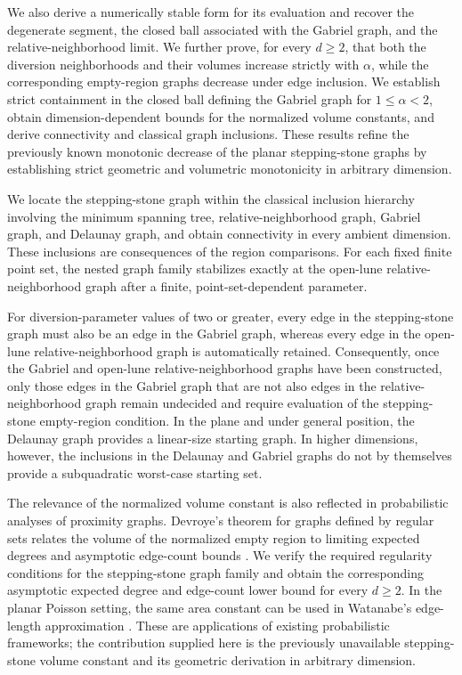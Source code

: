 \documentclass[a4paper,fleqn]{cas-dc}
\theoremstyle{definition}
\theoremstyle{remark}
\newcommand{\0}{\mathbf{0}}
\begin{document}
We also derive a numerically stable form for its evaluation and recover the
degenerate segment, the closed ball associated with the Gabriel graph, 
and the relative-neighborhood limit.
We further prove, for every $d\geq2$, that both the diversion neighborhoods
and their volumes increase strictly with $\alpha$, while the corresponding
empty-region graphs decrease under edge inclusion. We establish strict
containment in
the closed ball defining the Gabriel graph
for $1\leq\alpha<2$, obtain dimension-dependent bounds for the normalized
volume constants, and derive connectivity and classical graph inclusions.
These results refine the previously known monotonic decrease of the planar
stepping-stone graphs by establishing strict geometric and volumetric
monotonicity in arbitrary dimension.


We
locate the stepping-stone graph within 
the classical inclusion hierarchy involving the
minimum spanning tree, relative-neighborhood graph, Gabriel graph, and
Delaunay graph, and obtain connectivity in every ambient dimension. 
These inclusions are consequences of the region comparisons. 
For each fixed finite
point set, the nested graph family stabilizes exactly at the open-lune
relative-neighborhood graph after a finite, point-set-dependent parameter.



For diversion-parameter values of two or greater, 
every edge in the stepping-stone graph
must also be an edge in the Gabriel graph, 
whereas every edge in the open-lune relative-neighborhood graph
is automatically retained. Consequently, once the Gabriel and open-lune
relative-neighborhood graphs have been constructed, 
only those edges in the Gabriel graph that are not also edges 
in the relative-neighborhood graph remain undecided and require
evaluation of the stepping-stone empty-region condition. In the plane and
under general position, the Delaunay graph provides a linear-size starting
graph. In higher dimensions, however, 
the inclusions in the Delaunay and Gabriel graphs
do not by themselves provide a subquadratic worst-case starting set.

The relevance of the normalized volume constant is also reflected in
probabilistic analyses of proximity graphs.
Devroye's theorem for graphs defined by regular sets
relates the volume of the normalized empty
region to limiting expected degrees and asymptotic edge-count bounds
\citep{devroye1988expected}. We verify the required regularity conditions for
the stepping-stone graph family and obtain the corresponding asymptotic expected
degree and edge-count lower bound for every $d\geq2$.
In the planar Poisson setting, the same area constant can be used in
Watanabe's edge-length approximation
\citep{watanabe2008evaluating}.
These are applications of existing probabilistic frameworks; the
contribution supplied here is the previously unavailable stepping-stone
volume constant and its geometric derivation in arbitrary dimension.
\end{document}
